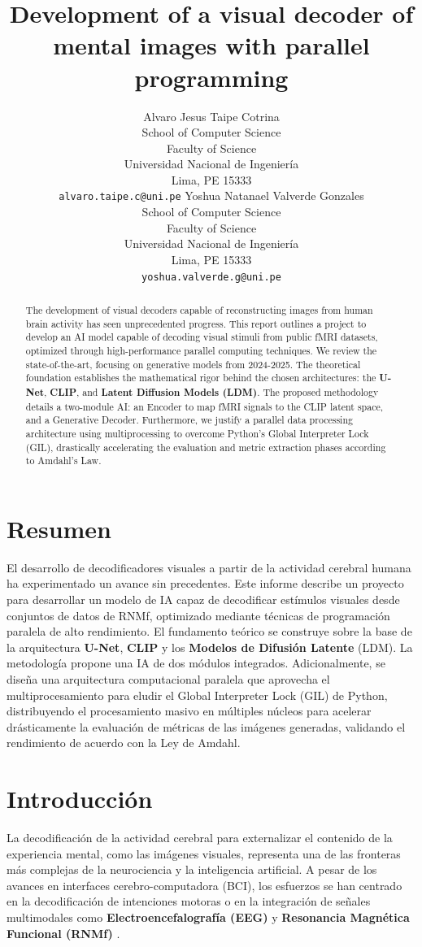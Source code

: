 \documentclass{article}
\title{Development of a visual decoder of mental images with parallel programming}
\author{
  Alvaro Jesus Taipe Cotrina \\
  School of Computer Science \\
  Faculty of Science \\
  Universidad Nacional de Ingeniería \\
  Lima, PE 15333 \\
  \texttt{alvaro.taipe.c@uni.pe} 
  \And
  Yoshua Natanael Valverde Gonzales \\
  School of Computer Science \\
  Faculty of Science \\
  Universidad Nacional de Ingeniería \\
  Lima, PE 15333 \\
  \texttt{yoshua.valverde.g@uni.pe}
}
\begin{document}
\maketitle


\begin{abstract}
   The development of visual decoders capable of reconstructing images from human brain activity has seen unprecedented progress. This report outlines a project to develop an AI model capable of decoding visual stimuli from public fMRI datasets, optimized through high-performance parallel computing techniques. We review the state-of-the-art, focusing on generative models from 2024-2025. The theoretical foundation establishes the mathematical rigor behind the chosen architectures: the \textbf{U-Net}, \textbf{CLIP}, and \textbf{Latent Diffusion Models (LDM)}. The proposed methodology details a two-module AI: an Encoder to map fMRI signals to the CLIP latent space, and a Generative Decoder. Furthermore, we justify a parallel data processing architecture using multiprocessing to overcome Python's Global Interpreter Lock (GIL), drastically accelerating the evaluation and metric extraction phases according to Amdahl's Law.
\end{abstract}
\section{Resumen}
El desarrollo de decodificadores visuales a partir de la actividad cerebral humana ha experimentado un avance sin precedentes. Este informe describe un proyecto para desarrollar un modelo de IA capaz de decodificar estímulos visuales desde conjuntos de datos de RNMf, optimizado mediante técnicas de programación paralela de alto rendimiento. El fundamento teórico se construye sobre la base de la arquitectura \textbf{U-Net}, \textbf{CLIP} y los \textbf{Modelos de Difusión Latente} (LDM). La metodología propone una IA de dos módulos integrados. Adicionalmente, se diseña una arquitectura computacional paralela que aprovecha el multiprocesamiento para eludir el Global Interpreter Lock (GIL) de Python, distribuyendo el procesamiento masivo en múltiples núcleos para acelerar drásticamente la evaluación de métricas de las imágenes generadas, validando el rendimiento de acuerdo con la Ley de Amdahl.

\section{Introducción}
La decodificación de la actividad cerebral para externalizar el contenido de la experiencia mental, como las imágenes visuales, representa una de las fronteras más complejas de la neurociencia y la inteligencia artificial. A pesar de los avances en interfaces cerebro-computadora (BCI), los esfuerzos se han centrado en la decodificación de intenciones motoras  o en la integración de señales multimodales como \textbf{Electroencefalografía (EEG)} y  \textbf{Resonancia Magnética Funcional (RNMf)} \cite{4}.
\end{document}
